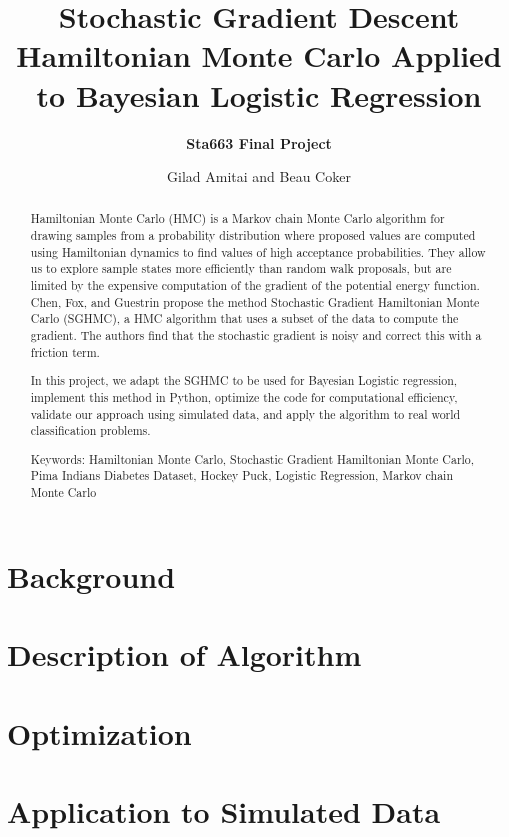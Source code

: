 \documentclass[12pt]{article}
\begin{document}
\vspace{-1in}
\author{\bf Sta663 Final Project}
\title{\bf Stochastic Gradient Descent Hamiltonian Monte Carlo Applied to Bayesian Logistic Regression}
\date{Gilad Amitai and Beau Coker}
\maketitle 


\begin{abstract}
	Hamiltonian Monte Carlo (HMC) is a Markov chain Monte Carlo algorithm for drawing samples from a probability distribution where proposed values are computed using Hamiltonian dynamics to find values of high acceptance probabilities. They allow us to explore sample states more efficiently than random walk proposals, but are limited by the expensive computation of the gradient of the potential energy function. Chen, Fox, and Guestrin propose the method Stochastic Gradient Hamiltonian Monte Carlo (SGHMC), a HMC algorithm that uses a subset of the data to compute the gradient. The authors find that the stochastic gradient is noisy and correct this with a friction term.

	In this project, we adapt the SGHMC to be used for Bayesian Logistic regression, implement this method in Python, optimize the code for computational efficiency, validate our approach using simulated data, and apply the algorithm to real world classification problems.
	
	Keywords: Hamiltonian Monte Carlo, Stochastic Gradient Hamiltonian Monte Carlo, Pima Indians Diabetes Dataset, Hockey Puck, Logistic Regression, Markov chain Monte Carlo
\end{abstract}

\section{Background}


\section{Description of Algorithm}


\section{Optimization}


\section{Application to Simulated Data}

\end{document}
